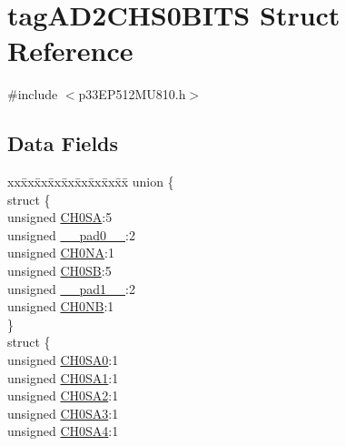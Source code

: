 \hypertarget{structtag_a_d2_c_h_s0_b_i_t_s}{}\section{tag\+A\+D2\+C\+H\+S0\+B\+I\+TS Struct Reference}
\label{structtag_a_d2_c_h_s0_b_i_t_s}


{\ttfamily \#include $<$p33\+E\+P512\+M\+U810.\+h$>$}

\subsection*{Data Fields}
\begin{DoxyCompactItemize}
\item 
\begin{tabbing}
xx\=xx\=xx\=xx\=xx\=xx\=xx\=xx\=xx\=\kill
union \{\\
\>struct \{\\
\>\>unsigned \hyperlink{structtag_a_d2_c_h_s0_b_i_t_s_a02d06e75304627f3824dd70952f074d2}{CH0SA}:5\\
\>\>unsigned \hyperlink{structtag_a_d2_c_h_s0_b_i_t_s_adf71f3d8410c1f1dbbc96680a92c49af}{\_\_pad0\_\_}:2\\
\>\>unsigned \hyperlink{structtag_a_d2_c_h_s0_b_i_t_s_a5db650d0700caff6850dc47668e109ff}{CH0NA}:1\\
\>\>unsigned \hyperlink{structtag_a_d2_c_h_s0_b_i_t_s_a66d2ac9bba669ad194278b166cd6776a}{CH0SB}:5\\
\>\>unsigned \hyperlink{structtag_a_d2_c_h_s0_b_i_t_s_acaf2d0924a107ec6e8d2e31febaf66f9}{\_\_pad1\_\_}:2\\
\>\>unsigned \hyperlink{structtag_a_d2_c_h_s0_b_i_t_s_a0e89c6ef104a8cf903cc3fdc309c713c}{CH0NB}:1\\
\>\} \\
\>struct \{\\
\>\>unsigned \hyperlink{structtag_a_d2_c_h_s0_b_i_t_s_ad040e21f24497077491384226832e0f1}{CH0SA0}:1\\
\>\>unsigned \hyperlink{structtag_a_d2_c_h_s0_b_i_t_s_ac68dfa77744e3c55bbce068060289cd3}{CH0SA1}:1\\
\>\>unsigned \hyperlink{structtag_a_d2_c_h_s0_b_i_t_s_a0f9fa73ca9c5a78bcfa34160502080c1}{CH0SA2}:1\\
\>\>unsigned \hyperlink{structtag_a_d2_c_h_s0_b_i_t_s_a8ec5af4a17cf0003bf829ecc1fb900d2}{CH0SA3}:1\\
\>\>unsigned \hyperlink{structtag_a_d2_c_h_s0_b_i_t_s_af5d1b2f598350f956576b87bddac3433}{CH0SA4}:1\\

\end{tabbing}
\end{DoxyCompactItemize}
